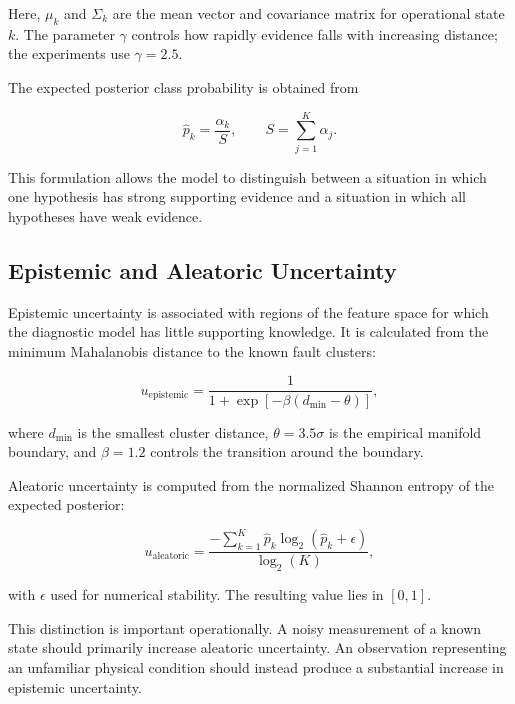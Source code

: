 \documentclass[conference]{IEEEtran}
\begin{document}
Here, $\mu_k$ and $\Sigma_k$ are the mean vector and covariance matrix for
operational state $k$. The parameter $\gamma$ controls how rapidly evidence
falls with increasing distance; the experiments use $\gamma=2.5$.

The expected posterior class probability is obtained from

\begin{equation}
\hat{p}_k=\frac{\alpha_k}{S},
\qquad
S=\sum_{j=1}^{K}\alpha_j.
\label{eq:posterior}
\end{equation}

This formulation allows the model to distinguish between a situation in
which one hypothesis has strong supporting evidence and a situation in which
all hypotheses have weak evidence.

\subsection{Epistemic and Aleatoric Uncertainty}

Epistemic uncertainty is associated with regions of the feature space for
which the diagnostic model has little supporting knowledge. It is calculated
from the minimum Mahalanobis distance to the known fault clusters:

\begin{equation}
u_{\mathrm{epistemic}}
=
\frac{1}
{1+\exp[-\beta(d_{\min}-\theta)]},
\label{eq:epistemic}
\end{equation}

where $d_{\min}$ is the smallest cluster distance,
$\theta=3.5\sigma$ is the empirical manifold boundary, and $\beta=1.2$
controls the transition around the boundary.

Aleatoric uncertainty is computed from the normalized Shannon entropy of the
expected posterior:

\begin{equation}
u_{\mathrm{aleatoric}}
=
\frac{
-\sum_{k=1}^{K}\hat{p}_k
\log_2(\hat{p}_k+\epsilon)
}
{\log_2(K)},
\label{eq:aleatoric}
\end{equation}

with $\epsilon$ used for numerical stability. The resulting value lies in
$[0,1]$.

This distinction is important operationally. A noisy measurement of a known
state should primarily increase aleatoric uncertainty. An observation
representing an unfamiliar physical condition should instead produce a
substantial increase in epistemic uncertainty.
\end{document}
